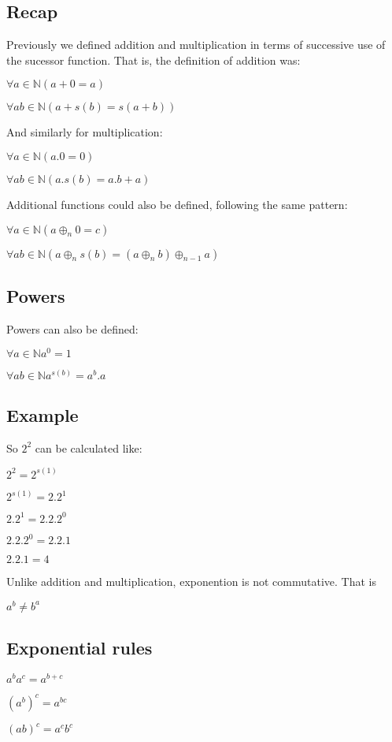 \subsection{Recap}

Previously we defined addition and multiplication in terms of successive use of the sucessor function. That is, the definition of addition was:

\(\forall a \in \mathbb{N} (a+0=a)\)

\(\forall a b \in \mathbb{N} (a+s(b)=s(a+b))\)

And similarly for multiplication:

\(\forall a \in \mathbb{N} (a.0=0)\)

\(\forall a b \in \mathbb{N} (a.s(b)=a.b+a)\)

Additional functions could also be defined, following the same pattern:

\(\forall a \in \mathbb{N} (a\oplus _n 0=c)\)

\(\forall a b \in \mathbb{N} (a\oplus _{n} s(b)=(a\oplus_{n} b)\oplus_{n-1}a)\)

\subsection{Powers}

Powers can also be defined:

\(\forall a \in \mathbb{N} a^0=1\)

\(\forall a b \in \mathbb{N} a^{s(b)}=a^b.a\)

\subsection{Example}

So \(2^2\) can be calculated like:

\(2^2=2^{s(1)}\)

\(2^{s(1)}=2.2^1\)

\(2.2^1=2.2.2^0\)

\(2.2.2^0=2.2.1\)

\(2.2.1=4\)

Unlike addition and multiplication, exponention is not commutative. That is

\(a^b\ne b^a\)

\subsection{Exponential rules}

\(a^ba^c=a^{b+c}\)

\((a^b)^c=a^{bc}\)

\((ab)^c=a^cb^c\)


